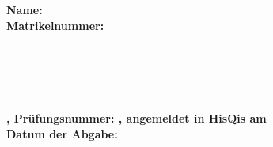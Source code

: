 \begin{titlepage}

    {\MeinLehrstuhl}
    {\MeinProf}

    \vspace{4cm}

    \veranstaltung{\MeineVeranstaltung}
    {\MeinSemester}
    {\MeinDozentIn}

    \titel{\thetitle}

    \vspace*{\fill}

    \begin{flushleft}
        \textbf{Name: \theauthor}\\
        \textbf{Matrikelnummer: \MeineMatrikelnummer}\\[0.5cm]
        \MeineMail\\
        \MeineAdresse\\
        \MeinOrt\\[0.5cm]
        \MeinStudiengang\\
        \MeinePrOrdnung\\[2cm]
        \textbf{\MeinModul, Prüfungsnummer: \MeinePrNummer, angemeldet in HisQis am \MeineAnmeldung}\\
        \textbf{Datum der Abgabe: \thedate}
    \end{flushleft}

\end{titlepage}